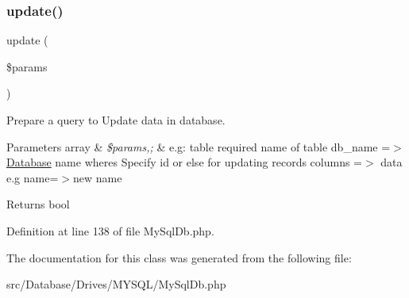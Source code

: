 \subsubsection{\texorpdfstring{update()}{update()}}
{\footnotesize\ttfamily update (\begin{DoxyParamCaption}\item[{}]{\$params }\end{DoxyParamCaption})}

Prepare a query to Update data in database.


\begin{DoxyParams}[1]{Parameters}
array & {\em \$params,;} & e.\+g\+: \textquotesingle{}table\textquotesingle{} required name of table \textquotesingle{}db\+\_\+name\textquotesingle{} =$>$ \mbox{\hyperlink{namespace_zest_1_1_database}{Database}} name \textquotesingle{}wheres\textquotesingle{} Specify id or else for updating records \textquotesingle{}columns\textquotesingle{} =$>$ data e.\+g name=$>$new name\\
\hline
\end{DoxyParams}
\begin{DoxyReturn}{Returns}
bool 
\end{DoxyReturn}


Definition at line 138 of file My\+Sql\+Db.\+php.



The documentation for this class was generated from the following file\+:\begin{DoxyCompactItemize}
\item 
src/\+Database/\+Drives/\+M\+Y\+S\+Q\+L/My\+Sql\+Db.\+php\end{DoxyCompactItemize}
